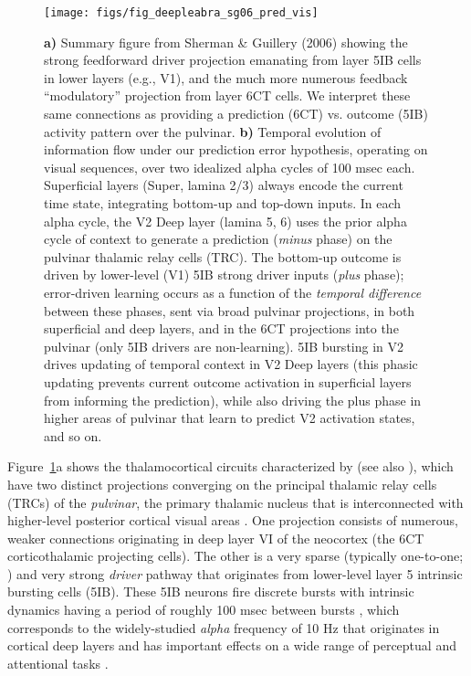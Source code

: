 \documentclass[11pt,twoside]{article}
\newif\myifpdf
\begin{document}
\begin{figure}
  \centering\texttt{[image: figs/fig\_deepleabra\_sg06\_pred\_vis]}
  \caption{{\bf a)} Summary figure from Sherman \& Guillery (2006) showing the strong feedforward driver projection emanating from layer 5IB cells in lower layers (e.g., V1), and the much more numerous feedback ``modulatory'' projection from layer 6CT cells.  We interpret these same connections as providing a prediction (6CT) vs. outcome (5IB) activity pattern over the pulvinar.  {\bf b)} Temporal evolution of information flow under our prediction error hypothesis, operating on visual sequences, over two idealized alpha cycles of 100 msec each.  Superficial layers (Super, lamina 2/3) always encode the current time state, integrating bottom-up and top-down inputs.  In each alpha cycle, the V2 Deep layer (lamina 5, 6) uses the prior alpha cycle of context to generate a prediction (\emph{minus} phase) on the pulvinar thalamic relay cells (TRC). The bottom-up outcome is driven by lower-level (V1) 5IB strong driver inputs (\emph{plus} phase); error-driven learning occurs as a function of the \emph{temporal difference} between these phases, sent via broad pulvinar projections, in both superficial and deep layers, and in the 6CT projections into the pulvinar (only 5IB drivers are non-learning).  5IB bursting in V2 drives updating of temporal context in V2 Deep layers (this phasic updating prevents current outcome activation in superficial layers from informing the prediction), while also driving the plus phase in higher areas of pulvinar that learn to predict V2 activation states, and so on.}
  \label{fig.sg06}
\end{figure}

Figure~\ref{fig.sg06}a shows the thalamocortical circuits characterized by \citet{ShermanGuillery06} (see also \citealp{ShermanGuillery13,UsreySherman18}), which have two distinct projections converging on the principal thalamic relay cells (TRCs) of the \emph{pulvinar}, the primary thalamic nucleus that is interconnected with higher-level posterior cortical visual areas \citep{Shipp03,ArcaroPinskKastner15,HalassaKastner17}.  One projection consists of numerous, weaker connections originating in deep layer VI of the neocortex (the 6CT corticothalamic projecting cells).  The other is a very sparse (typically one-to-one; \citealp{Rockland98a,Rockland96}) and very strong \emph{driver} pathway that originates from lower-level layer 5 intrinsic bursting cells (5IB).  These 5IB neurons fire discrete bursts with intrinsic dynamics having a period of roughly 100 msec between bursts \citep{ConnorsGutnickPrince82,SilvaAmitaiConnors91,LarkumZhuSakmann99,FranceschettiGuatteoPanzicaEtAl95,SaalmannPinskWangEtAl12}, which corresponds to the widely-studied \emph{alpha} frequency of 10 Hz that originates in cortical deep layers and has important effects on a wide range of perceptual and attentional tasks \citep{BuffaloFriesLandmanEtAl11,VanRullenKoch03,MathewsonGrattonFabianiEtAl09,JensenBonnefondVanRullen12,ClaytonYeungKadosh18}.
\end{document}
